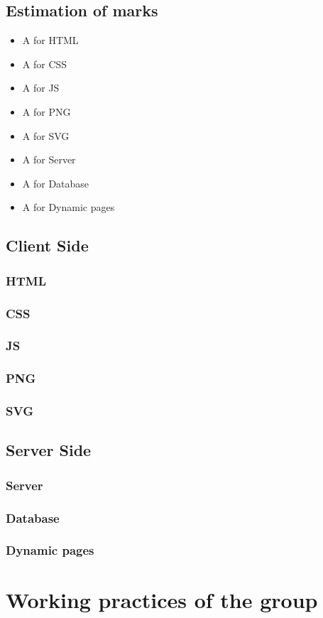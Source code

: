\documentclass[11pt]{article}
\begin{document}
	\subsection{Estimation of marks}
\begin{itemize}
	\item A for HTML
	\item A for CSS
	\item A for JS
	\item A for PNG	
	\item A for SVG
	\item A for Server
	\item A for Database
	\item A for Dynamic pages
\end{itemize}
	\subsection{Client Side}
	\subsubsection{HTML}
	\subsubsection{CSS}
	\subsubsection{JS}
	\subsubsection{PNG}
	\subsubsection{SVG}
	\subsection{Server Side}
	\subsubsection{Server}
	\subsubsection{Database}
	\subsubsection{Dynamic pages}
	
	\section{Working practices of the group}
	

	
	
	
	
\end{document}
